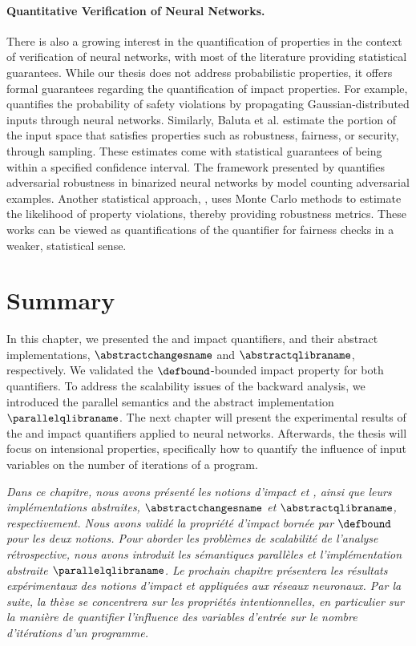 \paragraph{Quantitative Verification of Neural Networks.}

There is also a growing interest in the quantification of properties in the context of verification of neural networks, with most of the literature providing statistical guarantees.
While our thesis does not address probabilistic properties, it offers formal guarantees regarding the quantification of impact properties. For example,  quantifies the probability of safety violations by propagating Gaussian-distributed inputs through neural networks. Similarly, Baluta et al.  estimate the portion of the input space that satisfies properties such as robustness, fairness, or security, through sampling. These estimates come with statistical guarantees of being within a specified confidence interval. The framework presented by  quantifies adversarial robustness in binarized neural networks by model counting adversarial examples. Another statistical approach, , uses Monte Carlo methods to estimate the likelihood of property violations, thereby providing robustness metrics. These works can be viewed as quantifications of the \outcomesname{} quantifier for fairness checks in a weaker, statistical sense.


\section{Summary}

In this chapter, we presented the \changesname{} and \qlibraname{} impact quantifiers, and their abstract implementations, $\abstractchangesname$ and $\abstractqlibraname$, respectively.
We validated the $\defbound$-bounded impact property for both quantifiers.
To address the scalability issues of the backward analysis, we introduced the parallel semantics and the abstract implementation $\parallelqlibraname$.
The next chapter will present the experimental results of the \changesname{} and \qlibraname{} impact quantifiers applied to neural networks.
Afterwards, the thesis will focus on intensional properties, specifically how to quantify the influence of input variables on the number of iterations of a program.


\frenchdiv

\emph{Dans ce chapitre, nous avons présenté les notions d'impact \changesname{} et \qlibraname{}, ainsi que leurs implémentations abstraites, $\abstractchangesname$ et $\abstractqlibraname$, respectivement. Nous avons validé la propriété d'impact bornée par $\defbound$ pour les deux notions. Pour aborder les problèmes de scalabilité de l'analyse rétrospective, nous avons introduit les sémantiques parallèles et l'implémentation abstraite $\parallelqlibraname$. Le prochain chapitre présentera les résultats expérimentaux des notions d'impact \changesname{} et \qlibraname{} appliquées aux réseaux neuronaux. Par la suite, la thèse se concentrera sur les propriétés intentionnelles, en particulier sur la manière de quantifier l'influence des variables d'entrée sur le nombre d'itérations d'un programme.}
